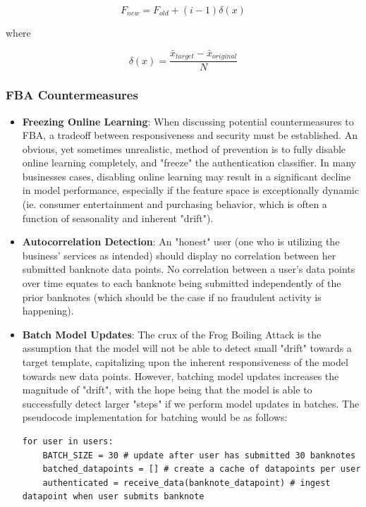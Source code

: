 \documentclass{article}
\begin{document}
\begin{equation}
F_{new} = F_{old} + (i - 1)\delta(x)
\end{equation}

where

\begin{equation}
\delta(x) = \frac{\bar{x}_{target}-\bar{x}_{original}}{N}
\end{equation}

\subsubsection{FBA Countermeasures}

\begin{itemize}
  \item \textbf{Freezing Online Learning}: When discussing potential countermeasures to FBA, a tradeoff between responsiveness and security must be established. An obvious, yet sometimes unrealistic, method of prevention is to fully disable online learning completely, and "freeze" the authentication classifier. In many businesses cases, disabling online learning may result in a significant decline in model performance, especially if the feature space is exceptionally dynamic (ie. consumer entertainment and purchasing behavior, which is often a function of seasonality and inherent "drift").
  \item \textbf{Autocorrelation Detection}: An "honest" user (one who is utilizing the business' services as intended) should display no correlation between her submitted banknote data points. No correlation between a user's data points over time equates to each banknote being submitted independently of the prior banknotes (which should be the case if no fraudulent activity is happening).
  \item \textbf{Batch Model Updates}: The crux of the Frog Boiling Attack is the assumption that the model will not be able to detect small "drift" towards a target template, capitalizing upon the inherent responsiveness of the model towards new data points. However, batching model updates increases the magnitude of "drift", with the hope being that the model is able to successfully detect larger "steps" if we perform model updates in batches. The pseudocode implementation for batching would be as follows:
\begin{lstlisting}
for user in users:
	BATCH_SIZE = 30 # update after user has submitted 30 banknotes
	batched_datapoints = [] # create a cache of datapoints per user
	authenticated = receive_data(banknote_datapoint) # ingest datapoint when user submits banknote
	

\end{lstlisting}
\end{itemize}
\end{document}
